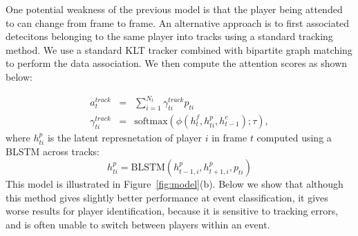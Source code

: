 One potential weakness of the previous model is that the
player being attended to can change from frame to frame.
An alternative approach is to first associated detecitons
belonging to the same player into tracks using a standard
tracking method. We use a standard KLT tracker combined with
bipartite graph matching to perform the data association.
We then compute the attention scores as shown below:

\begin{eqnarray} 
\label{eq:track}
  a_t^{track} & = & \sum_{i=1}^{N_t} \gamma_{ti}^{track} p_{ti} 
\\ \nonumber
  \gamma_{ti}^{track} & = & \text{softmax} \left(\phi\left(h^f_t, h^p_{ti}, h^e_{t-1}\right); \tau\right),
\end{eqnarray}
where $h_{ti}^p$ is the latent represnetation of player $i$ in frame
$t$ computed using a BLSTM across tracks:
\[
  h_{ti}^p = \mbox{BLSTM}(h_{t-1,i}^p, h_{t+1,i}^p, p_{ti})
\]
This model is illustrated in Figure~\ref{fig:model}(b).
Below  we show that although this method gives slightly better
performance at event classification, it gives worse results for player
identification, because it is sensitive to tracking errors, and
is often unable to switch between players within an event.
